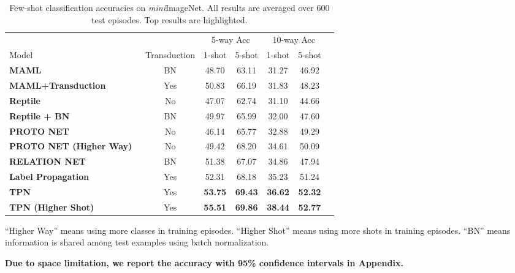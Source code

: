 \documentclass{article} \usepackage{iclr2019_conference,times}
\def\mini{{\textit{mini}ImageNet}}
\begin{document}
\begin{table}[t]
\centering
\begin{threeparttable}
\small
\caption{Few-shot classification accuracies on \mini. All results are averaged over 600 test episodes. Top results are highlighted.}
\label{mini-results}
\begin{tabular}{lcccccc} \hline
                                       					&              & \multicolumn{2}{c}{5-way Acc} & \multicolumn{2}{c}{10-way Acc}                           \\
Model                                  					& Transduction & \multicolumn{1}{c}{1-shot} & \multicolumn{1}{c}{5-shot} & \multicolumn{1}{c}{1-shot} & \multicolumn{1}{c}{5-shot}\\ \hline
\textbf{MAML~\citep{maml}}             					& BN & 48.70  & 63.11 & 31.27 & 46.92    \\
\textbf{MAML+Transduction}             					& Yes & 50.83  & 66.19 & 31.83 & 48.23    \\
\textbf{Reptile~\citep{first-order}}                    & No & 47.07  & 62.74 & 31.10 & 44.66    \\
\textbf{Reptile + BN~\citep{first-order}} 	            & BN & 49.97  & 65.99 & 32.00 & 47.60    \\
\textbf{PROTO NET~\citep{prototypical}}                 & No & 46.14  & 65.77 & 32.88 & 49.29    \\
\textbf{PROTO NET (Higher Way)~\citep{prototypical}}	& No & 49.42  & 68.20 & 34.61 & 50.09    \\
\textbf{RELATION NET~\citep{compare}}                  	& BN & 51.38  & 67.07 & 34.86 & 47.94    \\ \hline
\textbf{Label Propagation}                              & Yes & 52.31  & 68.18 & 35.23 & 51.24\\
\textbf{TPN}                                            & Yes & \textbf{53.75}    & \textbf{69.43} & \textbf{36.62} & \textbf{52.32}    \\
\textbf{TPN (Higher Shot)}                              & Yes & \textbf{55.51}    & \textbf{69.86} & \textbf{38.44} & \textbf{52.77}    \\ \hline
\end{tabular}
\begin{tablenotes}
  	\item * ``Higher Way'' means using more classes in training episodes. ``Higher Shot'' means using more shots in training episodes. ``BN'' means information is shared among test examples using batch normalization.
  	\item  \textbf{Due to space limitation, we report the accuracy with 95\% confidence intervals in Appendix.}
\end{tablenotes} 
\end{threeparttable}
\end{table}
\end{document}
